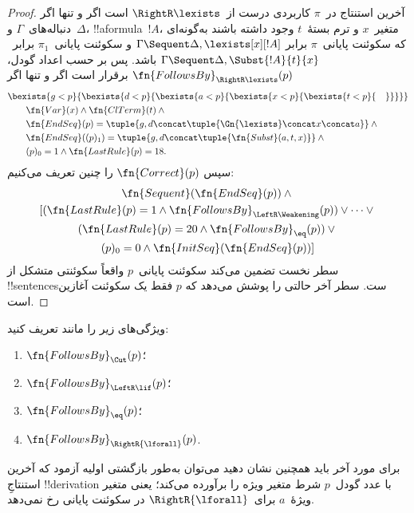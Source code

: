 \documentclass[../../../include/open-logic-section]{subfiles}
\begin{document}
\begin{proof}
آخرین استنتاج در~$\pi$ کاربردی درست از~$\RightR\lexists$ است اگر و
تنها اگر دنباله‌های~$\Gamma$ و~$\Delta$، !!a{formula}~$!A$، متغیر~$x$
و ترم بستهٔ~$t$ وجود داشته باشند به‌گونه‌ای که سکوئنت پایانی~$\pi$ برابر
$\Gamma\Sequent\Delta,\lexists[x][!A]$ و سکوئنت پایانی~$\pi_1$
برابر~$\Gamma\Sequent\Delta,\Subst{!A}{t}{x}$ باشد. پس بر حسب اعداد
گودل، $\fn{FollowsBy}_{\RightR\lexists}(p)$ برقرار است اگر و تنها اگر
\begin{align*}
  & \bexists{g<p}{\bexists{d<p}{\bexists{a<p}{\bexists{x<p}{\bexists{t<p}{\quad}}}}}\\
  & \qquad \fn{Var}(x) \land \fn{ClTerm}(t) \land {}\\
  & \qquad \fn{EndSeq}(p) =
  \tuple{
    g,
    d \concat \tuple{\Gn{\lexists} \concat x \concat a}
  } \land {}\\
  & \qquad \fn{EndSeq}((p)_1) =
  \tuple{
    g,
    d \concat \tuple{\fn{Subst}(a, t, x)}
  } \land {}\\
  & \qquad (p)_0 = 1 \land \fn{LastRule}(p) = 18.
\end{align*}
سپس $\fn{Correct}(p)$ را چنین تعریف می‌کنیم:
\begin{multline*}
  \fn{Sequent}(\fn{EndSeq}(p)) \land {}\\
  [(\fn{LastRule}(p) = 1 \land
  \fn{FollowsBy}_{\LeftR\Weakening}(p)) \lor \dots \lor {}\\
  (\fn{LastRule}(p) = 20 \land \fn{FollowsBy}_{\eq}(p)) \lor {}\\
  (p)_0 = 0 \land \fn{InitSeq}(\fn{EndSeq}(p))]
\end{multline*}
سطر نخست تضمین می‌کند سکوئنت پایانی~$p$ واقعاً سکوئنتی متشکل از
!!{sentence}sست. سطر آخر حالتی را پوشش می‌دهد که $p$ فقط یک سکوئنت
آغازین است.
\end{proof}

\begin{prob}
  ویژگی‌های زیر را مانند  تعریف
  کنید:
  \begin{enumerate}
  \item $\fn{FollowsBy}_{\Cut}(p)$؛
  \item $\fn{FollowsBy}_{\LeftR\lif}(p)$؛
  \item $\fn{FollowsBy}_{\eq}(p)$؛
  \item $\fn{FollowsBy}_{\RightR{\lforall}}(p)$.
  \end{enumerate}
  برای مورد آخر باید همچنین نشان دهید می‌توان به‌طور بازگشتی اولیه
  آزمود که آخرین استنتاجِ !!{derivation} با عدد گودل~$p$ شرط متغیر ویژه
  را برآورده می‌کند؛ یعنی متغیر ویژهٔ~$a$ برای~$\RightR{\lforall}$
  در سکوئنت پایانی رخ نمی‌دهد.
  \end{prob}
\end{document}
